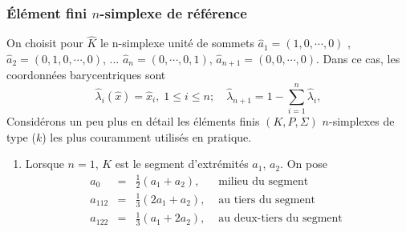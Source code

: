 \documentclass{beamer}
\begin{document}
\begin{frame}
\frametitle{Élément fini $n$-simplexe de référence}

On choisit pour $\widehat{K}$ le n-simplexe unité de sommets 
$\hat{a}_1= (1 , 0, \cdots, 0)$ , $\hat{a}_2= (0,1 , 0, \cdots, 0)$, ... $\hat{a}_n= (0 , \cdots, 0,1)$, $\hat{a}_{n+1}= (0 , 0, \cdots, 0)$. Dans ce cas, les coordonnées barycentriques sont
\begin{equation}
\hat{\lambda}_i(\hat{x})=\hat{x}_i,\; 1\leq i\leq n;\quad \hat{\lambda}_{n+1}=1-\sum_{i=1}^n\hat{\lambda}_i,
\end{equation}
       Considérons un peu plus en détail les éléments finis $(K, P, \Sigma)$ $n$-simplexes de 
type ($k$) les plus couramment utilisés en pratique.
\begin{enumerate}
\item Lorsque $n=1$, $K$ est le segment d'extrémités $a_1$, $a_2$. On pose
\[\begin{array}{lcll}
a_{0}&=&\frac{1}{2}(a_1+a_2),&\mbox{ milieu du segment }\\
a_{112}&=&\frac{1}{3}(2a_1+a_2), & \mbox{ au tiers du segment }\\
a_{122}&=&\frac{1}{3}(a_1+2a_2), &  \mbox{ au deux-tiers du segment }
\end{array}
\]

\begin{center}
 \end{center}

\end{enumerate}
\end{frame}
\end{document}
